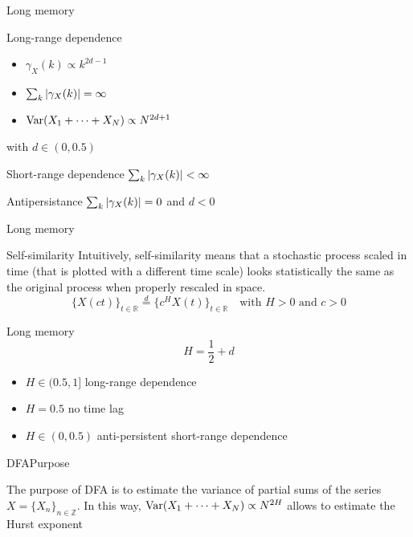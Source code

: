 \documentclass{beamer}
\newcommand{\numberset}{\mathbb}
\newcommand{\R}{\numberset{R}}
\newcommand{\Z}{\numberset{Z}}
\newcommand{\deq}{\overset{d}{=}}
\begin{document}
\begin{frame}{Long memory}
	\begin{block}{Long-range dependence}
		\begin{itemize}
			\item $\gamma_X(k) \propto	k^{2d -1}$
			\item $\sum_{k} \abs{\gamma_X(k)} = \infty$
			\item $\textnormal{Var}(X_1 + \dots + X_N) \propto N^{2d + 1}$
		\end{itemize}
		with $ d \in (0, 0.5) $
	\end{block}
	\begin{block}{Short-range dependence}
		$\sum_{k} \abs{\gamma_X(k)} < \infty$
	\end{block}
	\begin{block}{Antipersistance}
		$\sum_{k} \abs{\gamma_X(k)} = 0$ and $d < 0$
	\end{block}
\end{frame}


\begin{frame}{Long memory}
	\begin{block}{Self-similarity}
		Intuitively, self-similarity means that a stochastic process scaled in time (that is plotted with a different time scale) looks statistically the same as the original process when properly rescaled in space. 
		\begin{equation*}
			\{ X(ct) \}_{t \in \R} \deq \{ c^H X(t) \}_{t \in \R}  \quad \text{with $H>0$ and $c>0$}		
		\end{equation*} 
	\end{block}
\end{frame}

\begin{frame}{Long memory}
	\begin{equation*}
		H = \frac{1}{2} + d
	\end{equation*}
	\begin{itemize}
		\item $H \in (0.5, 1]$ long-range dependence
		\item $H = 0.5$ no time lag
		\item $H \in (0, 0.5)$ anti-persistent short-range dependence 
	\end{itemize}
\end{frame}

\begin{frame}{DFA}{Purpose}
	\begin{block}{}
		The purpose of DFA is to estimate the variance of partial sums of the series $X = \{ X_n \}_{n \in \Z}$. In this way, $\textnormal{Var}(X_1 + \dots + X_N) \propto N^{2H}$ allows to estimate the Hurst exponent
	\end{block}
\end{frame}
\end{document}
